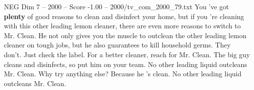 \begin{textsample}{NEG Dim 7 – 2000 – Score -1.00 – 2000/tv\_com\_2000\_79.txt}  \label{ex:f7_neg_039}
You 've got \textbf{plenty} of good reasons to clean and disinfect your home, but if you 're cleaning with this other leading lemon cleaner, there are even more reasons to switch to Mr.
Clean.
He not only gives you the muscle to outclean the other leading lemon cleaner on tough jobs, but he also guarantees to kill household germs.
They don't.
Just check the label.
For a better cleaner, reach for Mr.
Clean.
The big guy cleans and disinfects, so put him on your team.
No other leading liquid outcleans Mr.
Clean.
Why try anything else?
Because he 's clean.
No other leading liquid outcleans Mr.
Clean.

\end{textsample}
